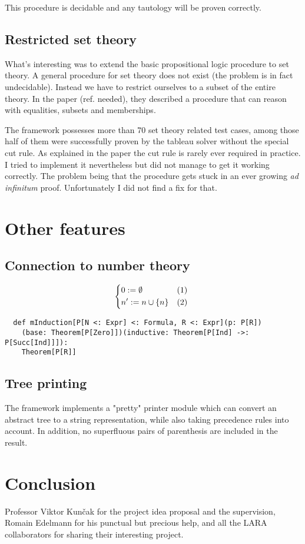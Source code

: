 \documentclass[acmlarge]{acmart}
\begin{document}
This procedure is decidable and any tautology will be proven correctly.

\subsection{Restricted set theory}

What's interesting was to extend the basic propositional logic procedure to set theory. A general procedure for set theory does not exist (the problem is in fact undecidable). Instead we have to restrict ourselves to a subset of the entire theory. In the paper (ref. needed), they described a procedure that can reason with equalities, subsets and memberships.

The framework possesses more than 70 set theory related test cases, among those half of them were successfully proven by the tableau solver without the special cut rule. As explained in the paper the cut rule is rarely ever required in practice. I tried to implement it nevertheless but did not manage to get it working correctly. The problem being that the procedure gets stuck in an ever growing \emph{ad infinitum} proof. Unfortunately I did not find a fix for that.

\section{Other features}

\subsection{Connection to number theory}



\[
\begin{dcases*}
0 := \emptyset & (1) \\
n' := n \cup \{n\} & (2) \\
\end{dcases*}
\]

\begin{verbatim}
  def mInduction[P[N <: Expr] <: Formula, R <: Expr](p: P[R])
    (base: Theorem[P[Zero]])(inductive: Theorem[P[Ind] ->: P[Succ[Ind]]]):
    Theorem[P[R]]
\end{verbatim}

\subsection{Tree printing}

The framework implements a "pretty" printer module which can convert an abstract tree to a string representation, while also taking precedence rules into account. In addition, no superfluous pairs of parenthesis are included in the result.

\section{Conclusion}


\begin{acks}
Professor Viktor Kunčak for the project idea proposal and the supervision, Romain Edelmann for his punctual but precious help, and all the LARA collaborators for sharing their interesting project.
\end{acks}
\end{document}
